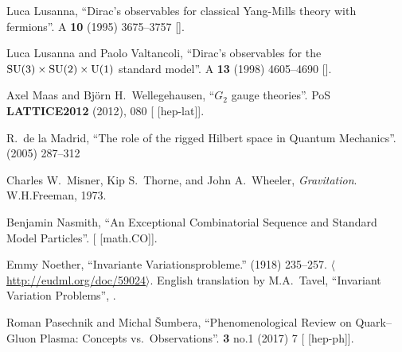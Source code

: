 \begin{thebibliography}{99}
Luca Lusanna,
``Dirac's observables for classical Yang-Mills theory with fermions''.
 A \textbf{10} (1995) 3675--3757
{\tt{}}
[].

Luca Lusanna and Paolo Valtancoli,
``Dirac's observables for the $\operatorname{SU}(3)\times\operatorname{SU}(2)\times\operatorname{U}(1)$ standard model''.
 A \textbf{13} (1998) 4605--4690
{\tt{}}
[].

Axel Maas and Bj\"{o}rn H.~Wellegehausen,
``$G_2$ gauge theories''.
PoS \textbf{LATTICE2012} (2012), 080
{\tt{}}
[ [hep-lat]].

R.~de la Madrid,
``The role of the rigged Hilbert space in Quantum Mechanics''.
  (2005) 287--312 
{\tt{}}

Charles W.~Misner, Kip S.~Thorne, and John A.~Wheeler,
\textit{Gravitation}.
W.H.Freeman, 1973.
\usesOurConventions

Benjamin Nasmith,
``An Exceptional Combinatorial Sequence and Standard Model Particles''.
[ [math.CO]].

Emmy Noether,
``Invariante Variationsprobleme.''
 (1918) 235--257.
$\langle$\url{http://eudml.org/doc/59024}$\rangle$. 
English translation by M.A.~Tavel, ``Invariant Variation Problems'',
.

Roman Pasechnik and Michal \v{S}umbera,
``Phenomenological Review on Quark--Gluon Plasma: Concepts vs.\ Observations''.
 \textbf{3} no.1 (2017) 7
{\tt{}}
[ [hep-ph]].


\end{thebibliography}
